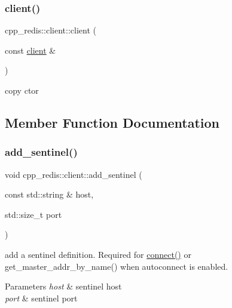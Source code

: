 \subsubsection{\texorpdfstring{client()}{client()}\hspace{0.1cm}{\footnotesize\ttfamily [3/3]}}
{\footnotesize\ttfamily cpp\+\_\+redis\+::client\+::client (\begin{DoxyParamCaption}\item[{const \hyperlink{classcpp__redis_1_1client}{client} \&}]{ }\end{DoxyParamCaption})\hspace{0.3cm}{\ttfamily [delete]}}



copy ctor 



\subsection{Member Function Documentation}
\mbox{\label{classcpp__redis_1_1client_a7050eb52856decad9ab2060a139f4b48}} 
\subsubsection{\texorpdfstring{add\+\_\+sentinel()}{add\_sentinel()}}
{\footnotesize\ttfamily void cpp\+\_\+redis\+::client\+::add\+\_\+sentinel (\begin{DoxyParamCaption}\item[{const std\+::string \&}]{host,  }\item[{std\+::size\+\_\+t}]{port }\end{DoxyParamCaption})}

add a sentinel definition. Required for \hyperlink{classcpp__redis_1_1client_adda8b3e7b4f9c80ac052753b39178dd5}{connect()} or get\+\_\+master\+\_\+addr\+\_\+by\+\_\+name() when autoconnect is enabled.


\begin{DoxyParams}{Parameters}
{\em host} & sentinel host \\
\hline
{\em port} & sentinel port \\
\hline
\end{DoxyParams}
\mbox{\label{classcpp__redis_1_1client_ad60647638d8758103e98894457652b84}} 
